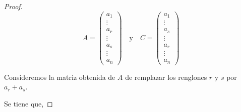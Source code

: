 \documentclass[letterpaper]{article}
\begin{document}
\begin{enumerate}
\begin{enumerate}[label=(\alph*)]
\begin{proof}
    \[
        A = 
        \begin{pmatrix}
            a_1\\
            \vdots\\
            a_r\\
            \vdots\\
            a_s\\
            \vdots\\
            a_n
        \end{pmatrix}
        \quad \text{y} \quad
        C = 
        \begin{pmatrix}
            a_1\\
            \vdots\\
            a_s\\
            \vdots\\
            a_r\\
            \vdots\\
            a_n
        \end{pmatrix}
    \]
    
    Consideremos la matriz obtenida de $A$ de remplazar los renglones $r$ y $s$ por $a_r + a_s$.

    Se tiene que,


\end{proof}
\end{enumerate}
\end{enumerate}
\end{document}
